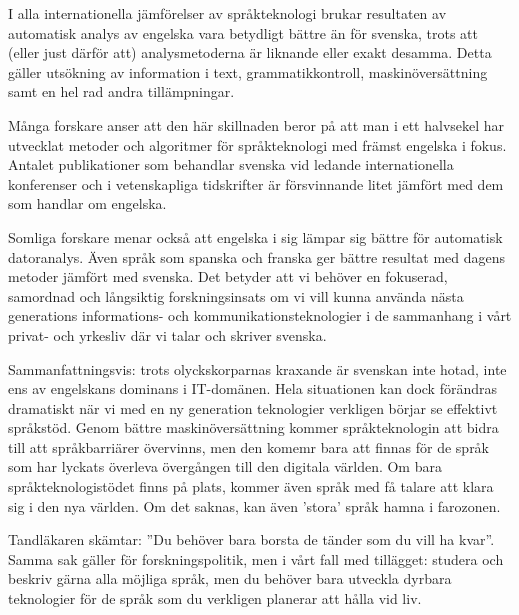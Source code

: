 \begin{multicols}{2}
I alla internationella jämförelser av språkteknologi brukar resultaten
av automatisk analys av engelska vara betydligt bättre än för svenska,
trots att (\mbox{eller} just därför att) analysmetoderna är liknande eller
\mbox{exakt} desamma. Detta gäller utsökning av information i text,
grammatikkontroll, maskinöversättning samt en hel rad andra
tillämpningar.

Många forskare anser att den här skillnaden beror på att man i ett
halvsekel har utvecklat metoder och algo\-ritmer för språkteknologi med
främst engelska i fokus. Antalet publikationer som behandlar svenska
vid ledande internationella konferenser och i vetenskapliga
tidskrifter är försvinnande litet jämfört med dem som handlar om
engelska.

Somliga forskare menar också att engelska i sig lämpar sig bättre för
automatisk datoranalys. Även språk som spanska och franska ger bättre
resultat med \mbox{dagens} metoder jämfört med svenska. Det betyder att vi
behöver en fokuserad, samordnad och lång\-siktig forskningsinsats om vi
vill kunna an\-vända nästa generations informations- och
kommunikationsteknologier i de sammanhang i vårt privat- och yrkesliv
där vi talar och skriver svenska.

Sammanfattningsvis: trots olyckskorparnas krax\-ande är svenskan inte
hotad, inte ens av engelskans dominans i IT-domänen. Hela situationen
kan dock förändras dramatiskt när vi med en ny generation teknologier
verkligen börjar se effektivt språkstöd. Genom bättre
maskinöversättning kommer språkteknologin att bidra till att
språkbarriärer övervinns, men den komemr bara att finnas för de språk
som har lyckats överleva övergången till den digitala värld\-en. Om bara
språkteknologistödet finns på plats, kommer även språk med få talare
att klara sig i den nya världen. Om det saknas, kan även 'stora' språk
hamna i farozonen.

Tandläkaren skämtar: ''Du behöver bara borsta de tänder som du vill ha
kvar''. Samma sak gäller för forskningspolitik, men i vårt fall med
tillägget: \mbox{studera} och beskriv gärna alla möjliga språk, men du
behöver bara utveckla dyrbara teknologier för de språk som du
verkligen planerar att hålla vid liv.


\end{multicols}

\clearpage


